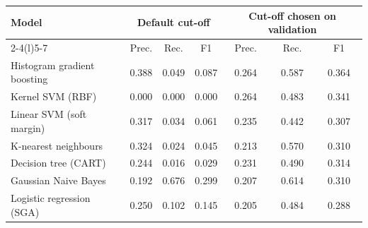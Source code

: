 \begin{tabular}{lcccccc}
\toprule
\multirow{2}{*}{Model} & \multicolumn{3}{c}{Default cut-off} & \multicolumn{3}{c}{Cut-off chosen on validation} \\
\cmidrule(lr){2-4}\cmidrule(l){5-7}
 & Prec. & Rec. & F1 & Prec. & Rec. & F1 \\
\midrule
Histogram gradient boosting & 0.388 & 0.049 & 0.087 & 0.264 & 0.587 & 0.364 \\
Kernel SVM (RBF) & 0.000 & 0.000 & 0.000 & 0.264 & 0.483 & 0.341 \\
Linear SVM (soft margin) & 0.317 & 0.034 & 0.061 & 0.235 & 0.442 & 0.307 \\
K-nearest neighbours & 0.324 & 0.024 & 0.045 & 0.213 & 0.570 & 0.310 \\
Decision tree (CART) & 0.244 & 0.016 & 0.029 & 0.231 & 0.490 & 0.314 \\
Gaussian Naive Bayes & 0.192 & 0.676 & 0.299 & 0.207 & 0.614 & 0.310 \\
Logistic regression (SGA) & 0.250 & 0.102 & 0.145 & 0.205 & 0.484 & 0.288 \\
\bottomrule
\end{tabular}
